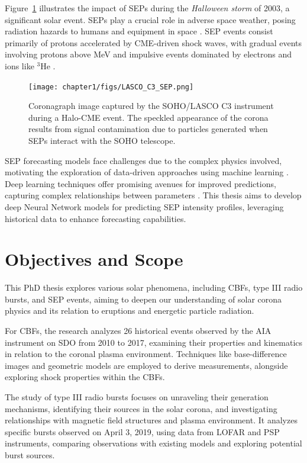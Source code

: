 Figure~\ref{fig_lasco_sep} illustrates the impact of SEPs during the \textit{Halloween storm} of 2003, a significant solar event. SEPs play a crucial role in adverse space weather, posing radiation hazards to humans and equipment in space \citep{reames_1999}. SEP events consist primarily of protons accelerated by CME-driven shock waves, with gradual events involving protons above  MeV and impulsive events dominated by electrons and ions like $^3$He \citep{reames_2013, nitta_2015}.

\begin{figure}[!htp]
	\centerline{\texttt{[image: chapter1/figs/LASCO\_C3\_SEP.png]}}
	\caption{Coronagraph image captured by the SOHO/LASCO C3 instrument during a Halo-CME event. The speckled appearance of the corona results from signal contamination due to particles generated when SEPs interact with the SOHO telescope.}
	\label{fig_lasco_sep}
\end{figure}

SEP forecasting models face challenges due to the complex physics involved, motivating the exploration of data-driven approaches using machine learning \citep{kahler_2007, laitinen_2017}. Deep learning techniques offer promising avenues for improved predictions, capturing complex relationships between parameters \citep{florios_2018, camporeale_2019}. This thesis aims to develop deep Neural Network models for predicting SEP intensity profiles, leveraging historical data to enhance forecasting capabilities.

\section{Objectives and Scope}
This PhD thesis explores various solar phenomena, including CBFs, type III radio bursts, and SEP events, aiming to deepen our understanding of solar corona physics and its relation to eruptions and energetic particle radiation.

For CBFs, the research analyzes 26 historical events observed by the AIA instrument on SDO from 2010 to 2017, examining their properties and kinematics in relation to the coronal plasma environment. Techniques like base-difference images and geometric models are employed to derive measurements, alongside exploring shock properties within the CBFs.

The study of type III radio bursts focuses on unraveling their generation mechanisms, identifying their sources in the solar corona, and investigating relationships with magnetic field structures and plasma environment. It analyzes specific bursts observed on April 3, 2019, using data from LOFAR and PSP instruments, comparing observations with existing models and exploring potential burst sources.

